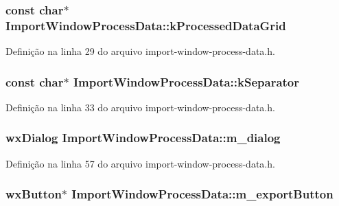 \subsubsection[{k\+Processed\+Data\+Grid}]{\setlength{\rightskip}{0pt plus 5cm}const char$\ast$ Import\+Window\+Process\+Data\+::k\+Processed\+Data\+Grid\hspace{0.3cm}{\ttfamily [static]}}\label{class_import_window_process_data_a01dc66e3c596e2577baaeb6465a265bb}


Definição na linha 29 do arquivo import-\/window-\/process-\/data.\+h.

\subsubsection[{k\+Separator}]{\setlength{\rightskip}{0pt plus 5cm}const char$\ast$ Import\+Window\+Process\+Data\+::k\+Separator\hspace{0.3cm}{\ttfamily [static]}}\label{class_import_window_process_data_a2411df0ebb5380917dc1c0dc81ec2a7c}


Definição na linha 33 do arquivo import-\/window-\/process-\/data.\+h.

\subsubsection[{m\+\_\+dialog}]{\setlength{\rightskip}{0pt plus 5cm}wx\+Dialog Import\+Window\+Process\+Data\+::m\+\_\+dialog\hspace{0.3cm}{\ttfamily [protected]}}\label{class_import_window_process_data_ae3dcec987287c58b8099e7edda9fb685}


Definição na linha 57 do arquivo import-\/window-\/process-\/data.\+h.

\subsubsection[{m\+\_\+export\+Button}]{\setlength{\rightskip}{0pt plus 5cm}wx\+Button$\ast$ Import\+Window\+Process\+Data\+::m\+\_\+export\+Button\hspace{0.3cm}{\ttfamily [protected]}}\label{class_import_window_process_data_a0b88b36f521c6735a7e869d6584014f5}


